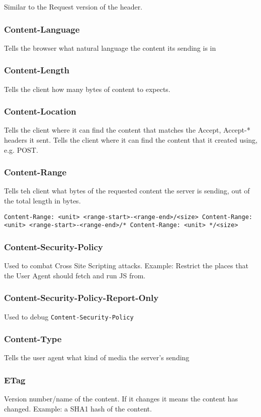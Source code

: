 \documentclass[../CMPUT-404-Notes.tex]{subfiles}
\begin{document}
Similar to the Request version of the header.

\subsubsection{Content-Language}
Tells the browser what natural language the content its sending is in

\subsubsection{Content-Length}
Tells the client how many bytes of content to expects.

\subsubsection{Content-Location}  
Tells the client where it can find the content that matches the Accept, Accept-* headers it sent.
Tells the client where it can find the content that it created using, e.g. POST.

\subsubsection{Content-Range}
Tells teh client what bytes of the requested content the server is sending, out of the total length in bytes. 

\texttt{Content-Range: <unit> <range-start>-<range-end>/<size>
Content-Range: <unit> <range-start>-<range-end>/*
Content-Range: <unit> */<size>}

\subsubsection{Content-Security-Policy}
Used to combat Cross Site Scripting attacks.
Example: Restrict the places that the User Agent should fetch and run JS from.

\subsubsection{Content-Security-Policy-Report-Only}
Used to debug \texttt{Content-Security-Policy}

\subsubsection{Content-Type}
Tells the user agent what kind of media the server's sending

\subsubsection{ETag}
Version number/name of the content. If it changes it means the content has changed.
Example: a SHA1 hash of the content.
\end{document}
